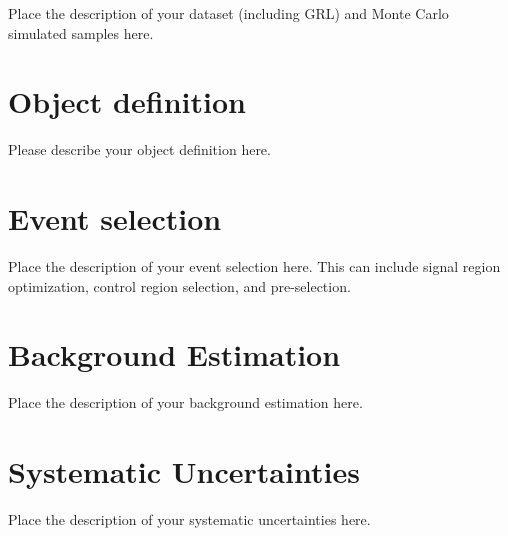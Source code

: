 \documentclass[NOTE, atlasdraft=true, texlive=2016, USenglish]{\ATLASLATEXPATH atlasdoc}
\begin{document}
Place the description of your dataset (including GRL) and Monte Carlo simulated samples here.

\section{Object definition}
\label{sec:objects}

Please describe your object definition here.

\section{Event selection}
\label{sec:selection}

Place the description of your event selection here.  This can include signal region optimization, control region selection, and pre-selection.

\section{Background Estimation}
\label{sec:backgrounds}

Place the description of your background estimation here.

\section{Systematic Uncertainties}
\label{sec:systematics}

Place the description of your systematic uncertainties here.
\end{document}
